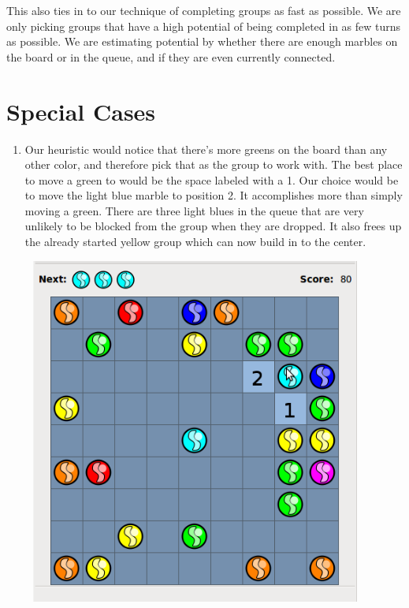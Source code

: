 \documentclass[a4paper,12pt]{article}
\begin{document}
This also ties in to our technique of completing groups as fast as
possible. We are only picking groups that have a high potential of
being completed in as few turns as possible. We are estimating
potential by whether there are enough marbles on the board or in the
queue, and if they are even currently connected.

\pagebreak

\section*{Special Cases}

\begin{enumerate}[1)]

  \item

    Our heuristic would notice that there's more greens on the board
    than any other color, and therefore pick that as the group to work
    with. The best place to move a green to would be the space labeled
    with a 1. Our choice would be to move the light blue marble to
    position 2. It accomplishes more than simply moving a green. There
    are three light blues in the queue that are very unlikely to be
    blocked from the group when they are dropped. It also frees up the
    already started yellow group which can now build in to the center.
    
    \vspace{1in}
    
    \begin{center}
      \includegraphics[width=4.5in, height=4.5in, keepaspectratio=true]{image/case1.png}
    \end{center}


\end{enumerate}
\end{document}
